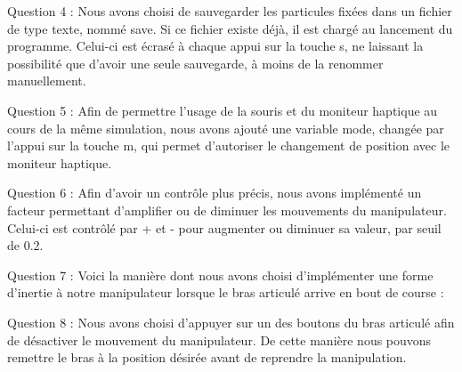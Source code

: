\documentclass[a4paper,12pt]{article}
\begin{document}
Question 4 : Nous avons choisi de sauvegarder les particules fixées dans un fichier de type texte, nommé \og{}save\fg{}. Si ce fichier existe déjà, il est chargé au lancement du programme. Celui-ci est écrasé à chaque appui sur la touche \og{}s\fg{}, ne laissant la possibilité que d'avoir une seule sauvegarde, à moins de la renommer manuellement.

Question 5 : Afin de permettre l'usage de la souris et du moniteur haptique au cours de la même simulation, nous avons ajouté une variable \og{}mode\fg{}, changée par l'appui sur la touche \og{}m\fg{}, qui permet d'autoriser le changement de position avec le moniteur haptique.

Question 6 : Afin d'avoir un contrôle plus précis, nous avons implémenté un facteur permettant d'amplifier ou de diminuer les mouvements du manipulateur. Celui-ci est contrôlé par \og{}+\fg{} et \og{}-\fg{} pour augmenter ou diminuer sa valeur, par seuil de 0.2.

Question 7 : Voici la manière dont nous avons choisi d'implémenter une forme d'inertie à notre manipulateur lorsque le bras articulé arrive en bout de course :

Question 8 : Nous avons choisi d'appuyer sur un des boutons du bras articulé afin de désactiver le mouvement du manipulateur. De cette manière nous pouvons remettre le bras à la position désirée avant de reprendre la manipulation.
\end{document}
